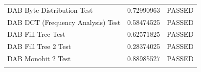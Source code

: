 \begin{table}[H]
\begin{center}
\begin{tabular}{|l |c |c |}
			\\[0.005ex]
			DAB Byte Distribution Test                                  &
			0.72990963                                                  & PASSED
			\\[0.005ex]
			DAB DCT (Frequency Analysis) Test                           &
			0.58474525                                                  & PASSED
			\\[0.005ex]
			DAB Fill Tree Test                                          &
			0.62571825                                                  & PASSED
			\\[0.005ex]
			DAB Fill Tree 2 Test                                        &
			0.28374025                                                  & PASSED
			\\[0.005ex]
			DAB Monobit 2 Test                                          &
			0.88985527                                                  & PASSED
			\\[0.005ex]
			\hline
			\multicolumn{1}{l}{}
		\end{tabular}%
	\end{center}
\end{table}

